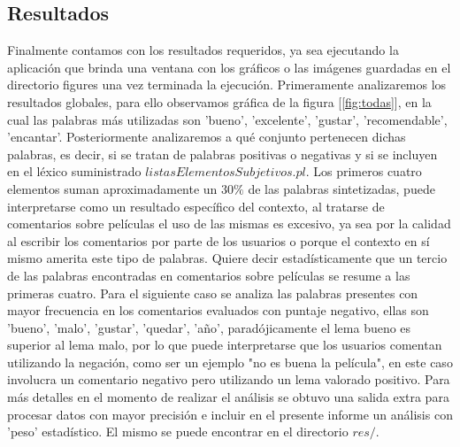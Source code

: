 \documentclass[12pt]{article}
\begin{document}
\subsection{Resultados}

Finalmente contamos con los resultados requeridos, ya sea ejecutando la aplicación que brinda una ventana con los gráficos o las imágenes guardadas en el directorio figures una vez terminada la ejecución.
Primeramente analizaremos los resultados globales, para ello observamos gráfica de la figura [\ref{fig:todas}], en la cual las palabras más utilizadas son 'bueno', 'excelente', 'gustar', 'recomendable', 'encantar'. Posteriormente analizaremos a qué conjunto pertenecen dichas palabras, es decir, si se tratan de palabras positivas o negativas y si se incluyen en el léxico suministrado $listasElementosSubjetivos.pl$. Los primeros cuatro elementos suman aproximadamente un $30 \%$ de las palabras sintetizadas, puede interpretarse como un resultado específico del contexto, al tratarse de comentarios sobre películas el uso de las mismas es excesivo, ya sea por la calidad al escribir los comentarios por parte de los usuarios o porque el contexto en sí mismo amerita este tipo de palabras. Quiere decir estadísticamente que un tercio de las palabras encontradas en comentarios sobre películas se resume a las primeras cuatro.
Para el siguiente caso se analiza las palabras presentes con mayor frecuencia en los comentarios evaluados con puntaje negativo, ellas son 'bueno', 'malo', 'gustar', 'quedar', 'año', paradójicamente el lema bueno es superior al lema malo, por lo que puede interpretarse que los usuarios comentan utilizando la negación, como ser un ejemplo "no es buena la película", en este caso involucra un comentario negativo pero utilizando un lema valorado positivo. Para más detalles en el momento de realizar el análisis se obtuvo una salida extra para procesar datos con mayor precisión e incluir en el presente informe un análisis con 'peso' estadístico. El mismo se puede encontrar en el directorio $res/$.
\end{document}

